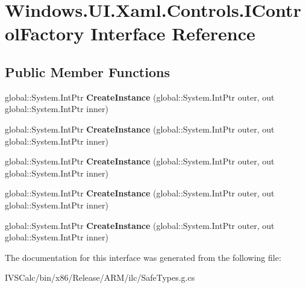 \hypertarget{interface_windows_1_1_u_i_1_1_xaml_1_1_controls_1_1_i_control_factory}{}\section{Windows.\+U\+I.\+Xaml.\+Controls.\+I\+Control\+Factory Interface Reference}
\label{interface_windows_1_1_u_i_1_1_xaml_1_1_controls_1_1_i_control_factory}
\subsection*{Public Member Functions}
\begin{DoxyCompactItemize}
\item 
\mbox{\label{interface_windows_1_1_u_i_1_1_xaml_1_1_controls_1_1_i_control_factory_a0ed6aaf300b85717c731bdb087fc36ef}} 
global\+::\+System.\+Int\+Ptr {\bfseries Create\+Instance} (global\+::\+System.\+Int\+Ptr outer, out global\+::\+System.\+Int\+Ptr inner)
\item 
\mbox{\label{interface_windows_1_1_u_i_1_1_xaml_1_1_controls_1_1_i_control_factory_a0ed6aaf300b85717c731bdb087fc36ef}} 
global\+::\+System.\+Int\+Ptr {\bfseries Create\+Instance} (global\+::\+System.\+Int\+Ptr outer, out global\+::\+System.\+Int\+Ptr inner)
\item 
\mbox{\label{interface_windows_1_1_u_i_1_1_xaml_1_1_controls_1_1_i_control_factory_a0ed6aaf300b85717c731bdb087fc36ef}} 
global\+::\+System.\+Int\+Ptr {\bfseries Create\+Instance} (global\+::\+System.\+Int\+Ptr outer, out global\+::\+System.\+Int\+Ptr inner)
\item 
\mbox{\label{interface_windows_1_1_u_i_1_1_xaml_1_1_controls_1_1_i_control_factory_a0ed6aaf300b85717c731bdb087fc36ef}} 
global\+::\+System.\+Int\+Ptr {\bfseries Create\+Instance} (global\+::\+System.\+Int\+Ptr outer, out global\+::\+System.\+Int\+Ptr inner)
\item 
\mbox{\label{interface_windows_1_1_u_i_1_1_xaml_1_1_controls_1_1_i_control_factory_a0ed6aaf300b85717c731bdb087fc36ef}} 
global\+::\+System.\+Int\+Ptr {\bfseries Create\+Instance} (global\+::\+System.\+Int\+Ptr outer, out global\+::\+System.\+Int\+Ptr inner)
\end{DoxyCompactItemize}


The documentation for this interface was generated from the following file\+:\begin{DoxyCompactItemize}
\item 
I\+V\+S\+Calc/bin/x86/\+Release/\+A\+R\+M/ilc/Safe\+Types.\+g.\+cs\end{DoxyCompactItemize}
